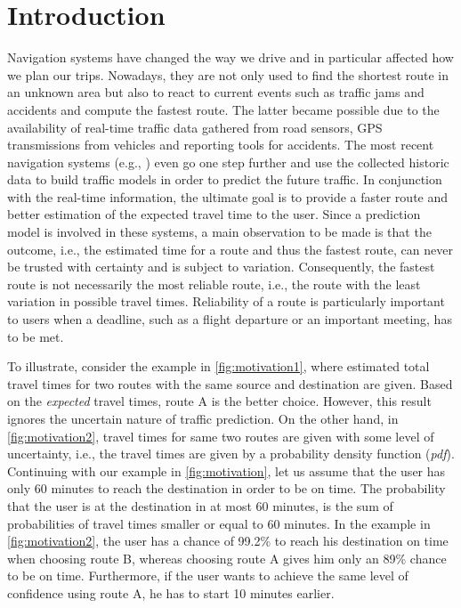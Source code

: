 \section{Introduction}

Navigation systems have changed the way we drive and in particular affected how we plan our trips. Nowadays, they are not only used to find the shortest route in an unknown area but also to react to current events such as traffic jams and accidents and compute the fastest route. The latter became possible due to the availability of real-time traffic data gathered from road sensors, GPS transmissions from vehicles and reporting tools for accidents. The most recent navigation systems (e.g., \cite{Pan13}) even go one step further and use the collected historic data to build traffic models in order to predict the future traffic. In conjunction with the real-time information, the ultimate goal is to provide a faster route and better estimation of the expected travel time to the user. Since a prediction model is involved in these systems, a main observation to be made is that the outcome, i.e., the estimated time for a route and thus the fastest route, can never be trusted with certainty and is subject to variation. Consequently, the fastest route is not necessarily the most reliable route, i.e., the route with the least variation in possible travel times. Reliability of a route is particularly important to users when a deadline, such as a flight departure or an important meeting, has to be met. 

To illustrate, consider the example in \cref{fig:motivation1}, where estimated total travel times for two routes with the same source and destination are given. Based on the \textit{expected} travel times, route A is the better choice. However, this result ignores the uncertain nature of traffic prediction. On the other hand, in \cref{fig:motivation2}, travel times for same two routes are given with some level of uncertainty, i.e., the travel times are given by a probability density function (\textit{pdf}). Continuing with our example in \cref{fig:motivation}, let us assume that the user has only 60 minutes to reach the destination in order to be on time. The probability that the user is at the destination in at most 60 minutes, is the sum of probabilities of travel times smaller or equal to 60 minutes. In the example in \cref{fig:motivation2}, the user has a chance of 99.2\% to reach his destination on time when choosing route B, whereas choosing route A gives him only an 89\% chance to be on time. Furthermore, if the user wants to achieve the same level of confidence using route A, he has to start 10 minutes earlier.

